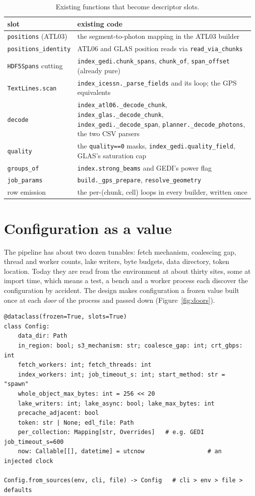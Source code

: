 \documentclass[10pt,a4paper]{article}
\newcommand{\code}[1]{\texttt{#1}}
\begin{document}
\begin{table}[h]
\footnotesize
\begin{tabular}{@{}lp{70mm}@{}}
\toprule
slot & existing code \\
\midrule
\code{positions} (ATL03) & the segment-to-photon mapping in the ATL03 builder \\
\code{positions\_identity} & ATL06 and GLAS position reads via \code{read\_via\_chunks} \\
\code{HDF5Spans} cutting & \code{index\_gedi.chunk\_spans}, \code{chunk\_of}, \code{span\_offset} (already pure) \\
\code{TextLines.scan} & \code{index\_icessn.\_parse\_fields} and its loop; the GPS equivalents \\
\code{decode} & \code{index\_atl06.\_decode\_chunk}, \code{index\_glas.\_decode\_chunk}, \code{index\_gedi.\_decode\_span}, \code{planner.\_decode\_photons}, the two CSV parsers \\
\code{quality} & the \code{quality==0} masks, \code{index\_gedi.quality\_field}, GLAS's saturation cap \\
\code{groups\_of} & \code{index.strong\_beams} and GEDI's power flag \\
\code{job\_params} & \code{build.\_gps\_prepare}, \code{resolve\_geometry} \\
row emission & the per-(chunk, cell) loops in every builder, written once \\
\bottomrule
\end{tabular}
\caption{Existing functions that become descriptor slots.}
\label{tab:slots}
\end{table}

\section{Configuration as a value}
\label{ch:config}

The pipeline has about two dozen tunables: fetch mechanism, coalescing gap, thread and worker counts, lake
writers, byte budgets, data directory, token location. Today they are read from the environment at about thirty
sites, some at import time, which means a test, a bench and a worker process each discover the configuration by
accident. The design makes configuration a frozen value built once at each \emph{door} of the process and passed
down (Figure~\ref{fig:doors}).

\begin{lstlisting}
@dataclass(frozen=True, slots=True)
class Config:
    data_dir: Path
    in_region: bool; s3_mechanism: str; coalesce_gap: int; crt_gbps: int
    fetch_workers: int; fetch_threads: int
    index_workers: int; job_timeout_s: int; start_method: str = "spawn"
    whole_object_max_bytes: int = 256 << 20
    lake_writers: int; lake_async: bool; lake_max_bytes: int
    precache_adjacent: bool
    token: str | None; edl_file: Path
    per_collection: Mapping[str, Overrides]   # e.g. GEDI job_timeout_s=600
    now: Callable[[], datetime] = utcnow                  # an injected clock

Config.from_sources(env, cli, file) -> Config   # cli > env > file > defaults
\end{lstlisting}
\end{document}
